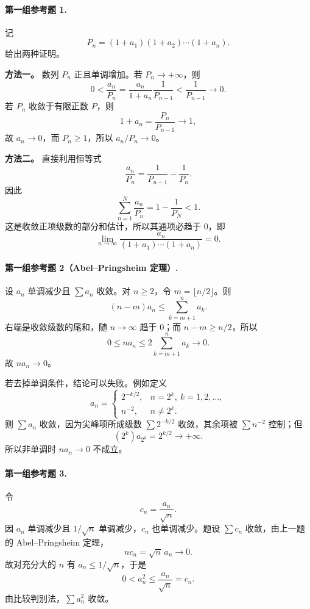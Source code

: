 \paragraph{第一组参考题 1.}
\begin{xsolution}
记
\[
 P_n=(1+a_1)(1+a_2)\cdots(1+a_n).
\]
给出两种证明。

\textbf{方法一。} 数列 $P_n$ 正且单调增加。若 $P_n\to+\infty$，则
\[
 0<\frac{a_n}{P_n}
 =\frac{a_n}{1+a_n}\frac1{P_{n-1}}
 <\frac1{P_{n-1}}\longrightarrow0.
\]
若 $P_n$ 收敛于有限正数 $P$，则
\[
 1+a_n=\frac{P_n}{P_{n-1}}\longrightarrow1,
\]
故 $a_n\to0$，而 $P_n\geq1$，所以 $a_n/P_n\to0$。

\textbf{方法二。} 直接利用恒等式
\[
 \frac{a_n}{P_n}
 =\frac1{P_{n-1}}-\frac1{P_n}.
\]
因此
\[
 \sum_{n=1}^{N}\frac{a_n}{P_n}
 =1-\frac1{P_N}<1.
\]
这是收敛正项级数的部分和估计，所以其通项必趋于 $0$，即
\[
 \boxed{\lim_{n\to\infty}\frac{a_n}{(1+a_1)\cdots(1+a_n)}=0.}
\]
\end{xsolution}

\paragraph{第一组参考题 2（Abel--Pringsheim 定理）.}
\begin{xsolution}
设 $a_n$ 单调减少且 $\sum a_n$ 收敛。对 $n\geq2$，令 $m=\lfloor n/2\rfloor$。则
\[
 (n-m)a_n\leq\sum_{k=m+1}^{n}a_k.
\]
右端是收敛级数的尾和，随 $n\to\infty$ 趋于 $0$；而 $n-m\geq n/2$，所以
\[
 0\leq na_n\leq2\sum_{k=m+1}^{n}a_k\longrightarrow0.
\]
故 $na_n\to0$。

若去掉单调条件，结论可以失败。例如定义
\[
 a_n=\begin{cases}
 2^{-k/2},&n=2^k,\ k=1,2,\ldots,\\
 n^{-2},&n\neq2^k.
 \end{cases}
\]
则 $\sum a_n$ 收敛，因为尖峰项所成级数 $\sum2^{-k/2}$ 收敛，其余项被 $\sum n^{-2}$ 控制；但
\[
 (2^k)a_{2^k}=2^{k/2}\to+\infty.
\]
所以非单调时 $na_n\to0$ 不成立。
\end{xsolution}

\paragraph{第一组参考题 3.}
\begin{xsolution}
令
\[
 c_n=\frac{a_n}{\sqrt n}.
\]
因 $a_n$ 单调减少且 $1/\sqrt n$ 单调减少，$c_n$ 也单调减少。题设 $\sum c_n$ 收敛，由上一题的 Abel--Pringsheim 定理，
\[
 nc_n=\sqrt n\,a_n\longrightarrow0.
\]
故对充分大的 $n$ 有 $a_n\leq1/\sqrt n$，于是
\[
 0<a_n^2\leq\frac{a_n}{\sqrt n}=c_n.
\]
由比较判别法，$\sum a_n^2$ 收敛。
\end{xsolution}

